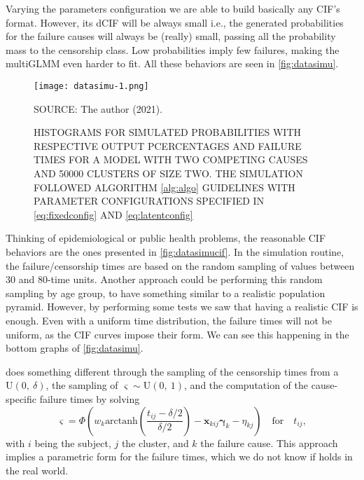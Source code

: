 Varying the parameters configuration we are able to build basically any
CIF's format. However, its dCIF will be always small i.e., the generated
probabilities for the failure causes will always be (really) small,
passing all the probability mass to the censorship class. Low
probabilities imply few failures, making the multiGLMM even harder to
fit. All these behaviors are seen in \autoref{fig:datasimu}.

\begin{figure}[H]
 \setlength{\abovecaptionskip}{.0001pt}
\caption{HISTOGRAMS FOR SIMULATED PROBABILITIES WITH RESPECTIVE OUTPUT
          PCERCENTAGES AND FAILURE TIMES FOR A MODEL WITH TWO COMPETING
          CAUSES AND 50000 CLUSTERS OF SIZE TWO. THE SIMULATION FOLLOWED
          ALGORITHM \autoref{alg:algo} GUIDELINES WITH PARAMETER
          CONFIGURATIONS SPECIFIED IN \autoref{eq:fixedconfig}
          AND \autoref{eq:latentconfig}}
\vspace{0.2cm}\centering
 \texttt{[image: datasimu-1.png]}\\
 \begin{footnotesize}
  SOURCE: The author (2021).
 \end{footnotesize}
 \label{fig:datasimu}
\end{figure}

Thinking of epidemiological or public health problems, the reasonable
CIF behaviors are the ones presented in \autoref{fig:datasimucif}. In
the simulation routine, the failure/censorship times are based on the
random sampling of values between 30 and 80-time units. Another approach
could be performing this random sampling by age group, to have something
similar to a realistic population pyramid. However, by performing some
tests we saw that having a realistic CIF is enough. Even with a uniform
time distribution, the failure times will not be uniform, as the CIF
curves impose their form. We can see this happening in the bottom graphs
of \autoref{fig:datasimu}.

 does something different through the sampling of
the censorship times from a \(\text{U}(0,~\delta)\), the sampling of
\(\varsigma\sim\text{U}(0,~1)\), and the computation of the
cause-specific failure times by solving
\[
 \varsigma =
 \Phi\left(w_{k}
           \text{arctanh}\left(\frac{t_{ij}-\delta/2}{\delta/2}\right) -
           \bm{x}_{kij}\bm{\gamma}_{k} - \eta_{kj}
     \right)
 \quad\text{for}\quad t_{ij},
\]
with \(i\) being the subject, \(j\) the cluster, and \(k\) the failure
cause. This approach implies a parametric form for the failure times,
which we do not know if holds in the real world.

